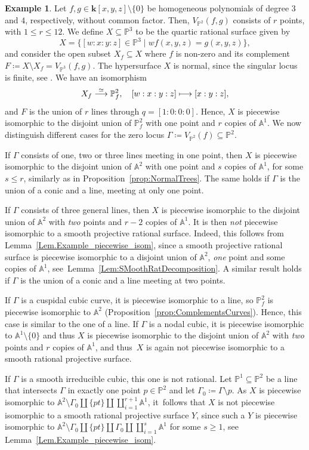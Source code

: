 \documentclass[JEP,XML,SOM,Unicode,NoFloatCountersInSection,published]{cedram}
\newcommand\mto{\mathchoice{\longmapsto}{\mapsto}{\mapsto}{\mapsto}}
\theoremstyle{definition}
\newtheorem{example}[lemma]{Example}
\newcommand\iso{\stackrel{\simeq}{\longrightarrow}}
\newcommand\A{{\mathbb A}}\let\AA\A
\renewcommand\k{{\mathbf k}}
\newcommand\p{{\mathbb P}}\let\PP\p
\begin{document}
\begin{example}\label{ExampleQuartics}
Let $f,g\in \k[x,y,z] \setminus \{0\}$
be homogeneous polynomials of degree $3$ and $4$, respectively, without common factor.
Then, $V_{\PP^2}(f,g)$ consists of $r$ points, with $1\le r\le 12$.
We define $X\subseteq \p^3$ to be the quartic rational surface given by
\[X=\{[w:x:y:z]\in \p^3\mid wf(x,y,z)=g(x,y,z)\},\]
and consider the open subset $X_f\subseteq X$ where $f$ is non-zero and its complement
$F \coloneqq X \setminus X_f = V_{\PP^3}(f, g)$.
The hypersurface $X$ is normal, since the singular locus is finite,
see \eg \cite[Ch.\,II, Prop.\,8.23]{Ha1977Algebraic-geometry}.
We have an isomorphism
\[
X_f\iso \p^2_f, \quad [w:x:y:z]\mto [x:y:z],
\]
and $F$ is the union of $r$ lines through $q=[1:0:0:0]$. Hence, $X$ is piecewise isomorphic to the disjoint union of $\p^2_f$ with one point and $r$ copies of $\A^1$. We now distinguish different cases for the zero locus
$\Gamma \coloneqq V_{\PP^2}(f) \subseteq \PP^2$.

If $\Gamma$ consists of one, two or three lines meeting in one point, then $X$ is piecewise isomorphic to the disjoint union of $\A^2$ with one point and $s$ copies of $\A^1$, for some $s\le r$, similarly as in Proposition~\ref{prop:NormalTrees}. The same holds if $\Gamma$ is the union of a conic and a line, meeting at only one point.

If $\Gamma$ consists of three general lines, then $X$ is piecewise isomorphic to the disjoint union of $\A^2$ with \emph{two} points and $r-2$ copies of $\A^1$. It is then \emph{not} piecewise isomorphic to a smooth
projective rational surface. Indeed, this follows from Lemma~\ref{Lem.Example_piecewise_isom}, since
a smooth projective rational surface is piecewise isomorphic to a disjoint union of $\AA^2$,
\emph{one} point and some copies of $\AA^1$, see~Lemma~\ref{Lem:SMoothRatDecomposition}.
A similar result holds if $\Gamma$ is the union of a conic and a line meeting at two points.

If $\Gamma$ is a cuspidal cubic curve, it is piecewise isomorphic to a line, so $\p^2_f$ is piecewise isomorphic to $\A^2$ (Proposition~\ref{prop:ComplementsCurves}). Hence, this case is similar to the one of a line. If $\Gamma$ is a nodal cubic, it is piecewise isomorphic to $\A^1\setminus \{0\}$ and thus $X$ is piecewise isomorphic to the disjoint union of $\A^2$ with \emph{two} points and $r$ copies of $\A^1$, and thus~$X$ is again not piecewise isomorphic to a
smooth rational projective surface.

If $\Gamma$ is a smooth irreducible cubic, this one is not rational.
Let $\PP^1 \subseteq \PP^2$ be a line that intersects $\Gamma$ in exactly one point $p \in \PP^2$
and let $\Gamma_0 \coloneqq \Gamma \setminus p$.
As $X$ is piecewise isomorphic to $\AA^2 \setminus \Gamma_0 \amalg \{pt\} \amalg \coprod_{i=1}^{r+1} \AA^1$,
it~follows that $X$ is not piecewise isomorphic to a smooth rational projective surface $Y$, since such a $Y$
is piecewise isomorphic to
$\AA^2 \setminus \Gamma_0 \amalg \{pt\} \amalg \Gamma_0 \amalg \coprod_{i=1}^s \AA^1$ for some $s \geq 1$, see Lemma~\ref{Lem.Example_piecewise_isom}.
\end{example}
\end{document}
